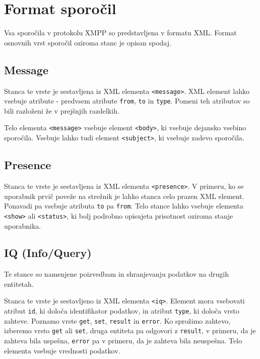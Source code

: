 \documentclass[11pt]{article}
\begin{document}
\section{Format sporočil}
\label{sec:org4727620}

Vsa sporočila v protokolu XMPP so predstavljena v formatu
XML. Format osnovnih vrst sporočil oziroma stanc je opisan spodaj.

\subsection{Message}
\label{sec:orge94bb2c}

Stanca te vrste je sestavljena iz XML elementa \texttt{<message>}. XML
element lahko vsebuje atribute - predvsem atribute \texttt{from}, \texttt{to} in
\texttt{type}. Pomeni teh atributov so bili razloženi že v prejšnjih
razdelkih.

Telo elementa \texttt{<message>} vsebuje element \texttt{<body>}, ki vsebuje
dejansko vsebino sporočila. Vsebuje lahko tudi element \texttt{<subject>}, ki
vsebuje zadevo sporočila.

\subsection{Presence}
\label{sec:org44af66f}

Stanca te vrste je sestavljena iz XML elementa \texttt{<presence>}. V
primeru, ko se uporabnik prvič poveže na strežnik je lahko stanca celo
prazen XML element. Ponavadi pa vsebuje atributa \texttt{to} pa \texttt{from}. Telo
stance lahko vsebuje elementa \texttt{<show>} ali \texttt{<status>}, ki bolj
podrobno opisujeta prisotnost oziroma stanje uporabnika.

\subsection{IQ (Info/Query)}
\label{sec:orgf731e2d}

Te stance so namenjene poizvedbam in shranjevanju podatkov na
drugih entitetah.

Stanca te vrste je sestavljeno iz XML elementa \texttt{<iq>}. Element mora
vsebovati atribut \texttt{id}, ki določa identifikator podatkov, in atribut
\texttt{type}, ki določa vrsto zahteve. Poznamo vrste \texttt{get}, \texttt{set}, \texttt{result}
in \texttt{error}. Ko sprožimo zahtevo, izberemo vrsto \texttt{get} ali \texttt{set}, druga
entiteta pa odgovori z \texttt{result}, v primeru, da je zahteva bila
uspešna, \texttt{error} pa v primeru, da je zahteva bila neuspešna. Telo
elementa vsebuje vrednosti podatkov.
\end{document}
